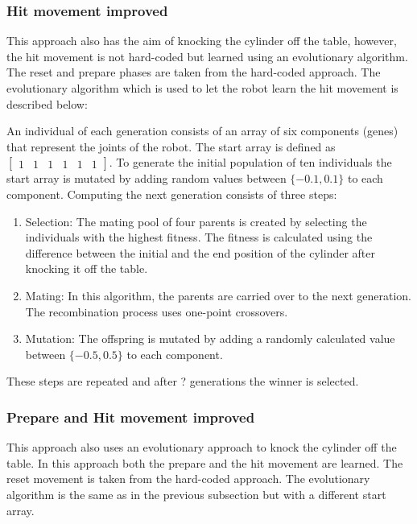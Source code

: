 \subsubsection{Hit movement improved} 

This approach also has the aim of knocking the cylinder off the table, however, the hit movement is not hard-coded but learned using an evolutionary algorithm. The reset and prepare phases are taken from the hard-coded approach.
The evolutionary algorithm which is used to let the robot learn the hit movement is described below: 

An individual of each generation consists of an array of six components (genes) that represent the joints of the robot. The start array is defined as $\begin{bmatrix}
				1 & 1 & 1 & 1 & 1 & 1
				\end{bmatrix}$.
To generate the initial population of ten individuals the start array is mutated by adding random values between $\{-0.1,0.1\}$ to each component.
Computing the next generation consists of three steps:
\begin{enumerate}
\item Selection: The mating pool of four parents is created by selecting the individuals with the highest fitness. The fitness is calculated using the difference between the initial and the end position of the cylinder after knocking it off the table.

\item Mating: In this algorithm, the parents are carried over to the next generation. The recombination process uses one-point crossovers. 

\item Mutation: The offspring is mutated by adding a randomly calculated value between $\{-0.5,0.5\}$ to each component.
\end{enumerate}

These steps are repeated and after ? generations the winner is selected.

\subsubsection{Prepare and Hit movement improved} 

This approach also uses an evolutionary approach to knock the cylinder off the table. In this approach both the prepare and the hit movement are learned. The reset movement is taken from the hard-coded approach. The evolutionary algorithm is the same as in the previous subsection but with a different start array. 

